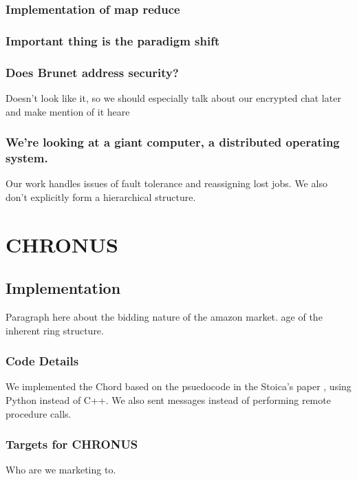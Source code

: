 \documentclass[conference, compsocconf, letterpaper]{IEEEtran}
\begin{document}
\subsubsection{Implementation of map reduce}

\subsubsection{Important thing is the paradigm shift}

\subsubsection{Does Brunet address security?}
Doesn't look like it, so we should especially talk about our encrypted chat later and make mention of it heare

\subsubsection{We're looking at a giant computer, a distributed operating system.}

Our work handles issues of fault tolerance and reassigning lost jobs.  We also don't explicitly form a hierarchical structure.









\section{CHRONUS}


\subsection{Implementation}
Paragraph here about the bidding nature of the amazon market.
age of the inherent ring structure.





\subsubsection{Code Details}
We implemented the Chord based on the psuedocode  in the Stoica's paper \cite{Chord}, using Python instead of C++.  We also sent messages instead of performing remote procedure calls.


\subsubsection{Targets for CHRONUS}
Who are we marketing to.
\end{document}

